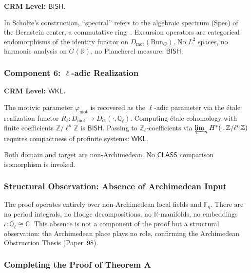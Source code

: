 \documentclass[11pt,a4paper]{article}
\theoremstyle{plain}
\theoremstyle{definition}
\newcommand{\BISH}{\textsf{BISH}}
\newcommand{\WKL}{\textsf{WKL}}
\newcommand{\CLASS}{\textsf{CLASS}}
\newcommand{\Dmot}{D_{\mathrm{mot}}}
\newcommand{\Bun}{\mathrm{Bun}}
\newcommand{\Spec}{\mathrm{Spec}}
\newcommand{\Z}{\mathbb{Z}}
\newcommand{\Q}{\mathbb{Q}}
\newcommand{\R}{\mathbb{R}}
\newcommand{\C}{\mathbb{C}}
\newcommand{\F}{\mathbb{F}}
\begin{document}
\textbf{CRM Level: $\BISH$.}

In Scholze's construction, ``spectral'' refers to the algebraic spectrum ($\Spec$) of the Bernstein center, a commutative ring~\cite{scholze-motivic-geometrization}. Excursion operators are categorical endomorphisms of the identity functor on $\Dmot(\Bun_G)$. No $L^2$ spaces, no harmonic analysis on $G(\R)$, no Plancherel measure: $\BISH$.

\subsubsection{Component 6: $\ell$-adic Realization}

\textbf{CRM Level: $\WKL$.}

The motivic parameter $\varphi_{\mathrm{mot}}$ is recovered as the $\ell$-adic parameter via the \'etale realization functor $R_\ell: \Dmot \to D_{\mathrm{\acute{e}t}}(\cdot, \Q_\ell)$. Computing \'etale cohomology with finite coefficients $\Z/\ell^n\Z$ is $\BISH$. Passing to $\Z_\ell$-coefficients via $\varprojlim_n H^*(\cdot, \Z/\ell^n\Z)$ requires compactness of profinite systems: $\WKL$.

Both domain and target are non-Archimedean. No $\CLASS$ comparison isomorphism is invoked.

\subsubsection{Structural Observation: Absence of Archimedean Input}

The proof operates entirely over non-Archimedean local fields and $\F_q$. There are no period integrals, no Hodge decompositions, no $\R$-manifolds, no embeddings $\iota: \overline{\Q_\ell} \cong \C$. This absence is not a component of the proof but a structural observation: the Archimedean place plays no role, confirming the Archimedean Obstruction Thesis (Paper~98).

\subsubsection{Completing the Proof of Theorem A}
\end{document}
